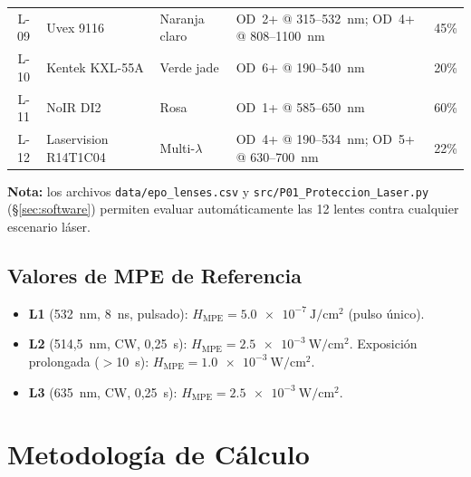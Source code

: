 \documentclass[12pt,a4paper]{article}
\begin{document}
\begin{table}[H]
\begin{tabularx}{\textwidth}{c l l X c}
		L-09        & Uvex 9116                                            & Naranja claro
		            & OD~2+ @ 315--532~nm; OD~4+ @ 808--1100~nm
		            & 45\%                                                                   \\
		L-10        & Kentek KXL-55A                                       & Verde jade
		            & OD~6+ @ 190--540~nm
		            & 20\%                                                                   \\
		L-11        & NoIR DI2                                             & Rosa
		            & OD~1+ @ 585--650~nm
		            & 60\%                                                                   \\
		L-12        & Laservision R14T1C04                                 & Multi-$\lambda$
		            & OD~4+ @ 190--534~nm; OD~5+ @ 630--700~nm
		            & 22\%                                                                   \\
		\bottomrule
	\end{tabularx}
\end{table}

\textbf{Nota:} los archivos \texttt{data/epo\_lenses.csv} y
\texttt{src/P01\_Proteccion\_Laser.py} (§\ref{sec:software}) permiten evaluar
automáticamente las 12 lentes contra cualquier escenario láser.

\subsection{Valores de MPE de Referencia}

\begin{itemize}
	\item \textbf{L1} (532~nm, 8~ns, pulsado):
	      $H_{\mathrm{MPE}} = \SI{5.0e-7}{\joule\per\centi\metre\squared}$
	      (pulso único).
	\item \textbf{L2} (514,5~nm, CW, 0,25~s):
	      $H_{\mathrm{MPE}} = \SI{2.5e-3}{\watt\per\centi\metre\squared}$.
	      Exposición prolongada ($>$10~s):
	      $H_{\mathrm{MPE}} = \SI{1.0e-3}{\watt\per\centi\metre\squared}$.
	\item \textbf{L3} (635~nm, CW, 0,25~s):
	      $H_{\mathrm{MPE}} = \SI{2.5e-3}{\watt\per\centi\metre\squared}$.
\end{itemize}

\section{Metodología de Cálculo}
\label{sec:metodologia}
\end{document}
